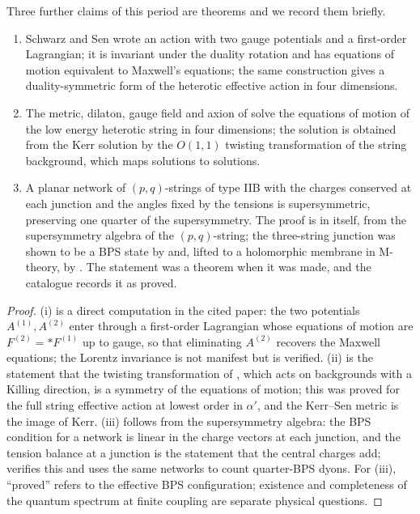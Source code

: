 Three further claims of this period are theorems and we record them briefly.

\begin{proposition}\label{prop:misc}
\begin{enumerate}[leftmargin=1.6em,itemsep=1pt]
\item[(i)] Schwarz and Sen \cite{SchwarzSen94} wrote an action with two gauge potentials and a first-order Lagrangian; it is invariant under the duality rotation and has equations of motion equivalent to Maxwell's equations; the same construction gives a duality-symmetric form of the heterotic effective action in four dimensions.
\item[(ii)] The metric, dilaton, gauge field and axion of \cite{Sen92kerr} solve the equations of motion of the low energy heterotic string in four dimensions; the solution is obtained from the Kerr solution by the $O(1,1)$ twisting transformation of the string background, which maps solutions to solutions.
\item[(iii)] A planar network of $(p,q)$-strings of type IIB with the charges conserved at each junction and the angles fixed by the tensions is supersymmetric, preserving one quarter of the supersymmetry. The proof is in \cite{Sen98network} itself, from the supersymmetry algebra of the $(p,q)$-string; the three-string junction was shown to be a BPS state by \cite{ReyYee98} and, lifted to a holomorphic membrane in M-theory, by \cite{MatsuoOkuyama98}. The statement was a theorem when it was made, and the catalogue records it as proved.
\end{enumerate}
\end{proposition}

\begin{proof}
(i) is a direct computation in the cited paper: the two potentials $A^{(1)}, A^{(2)}$ enter through a first-order Lagrangian whose equations of motion are $F^{(2)} = *F^{(1)}$ up to gauge, so that eliminating $A^{(2)}$ recovers the Maxwell equations; the Lorentz invariance is not manifest but is verified. (ii) is the statement that the twisting transformation of \cite{Sen92kerr}, which acts on backgrounds with a Killing direction, is a symmetry of the equations of motion; this was proved for the full string effective action at lowest order in $\alpha'$, and the Kerr--Sen metric is the image of Kerr. (iii) follows from the supersymmetry algebra: the BPS condition for a network is linear in the charge vectors at each junction, and the tension balance at a junction is the statement that the central charges add; \cite{Sen98network} verifies this and \cite{Sen07junction} uses the same networks to count quarter-BPS dyons. For (iii), ``proved'' refers to the effective BPS configuration; existence and completeness of the quantum spectrum at finite coupling are separate physical questions.
\end{proof}
